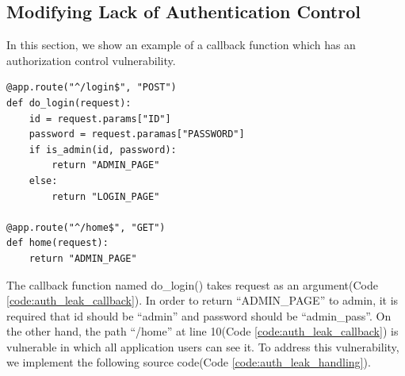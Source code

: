 \documentclass[conference]{IEEEtran}
\begin{document}
\subsection{Modifying Lack of Authentication Control}
In this section, we show an example of a callback function which has an authorization control vulnerability.
\begin{lstlisting}[caption={A vulnerable function which has an authentication leak.}, label=code:auth_leak_callback, captionpos=b]
@app.route("^/login$", "POST")
def do_login(request):
    id = request.params["ID"]
    password = request.paramas["PASSWORD"]
    if is_admin(id, password):
        return "ADMIN_PAGE"
    else:
        return "LOGIN_PAGE"

@app.route("^/home$", "GET")
def home(request):
    return "ADMIN_PAGE"
\end{lstlisting}
The callback function named do\_login() takes request as an argument(Code \ref{code:auth_leak_callback}).
In order to return “ADMIN\_PAGE” to admin, it is required that id should be “admin” and password should be “admin\_pass”.
On the other hand, the path “/home” at line 10(Code \ref{code:auth_leak_callback}) is vulnerable in which all application users can see it.
To address this vulnerability, we implement the following source code(Code \ref{code:auth_leak_handling}).
\end{document}
